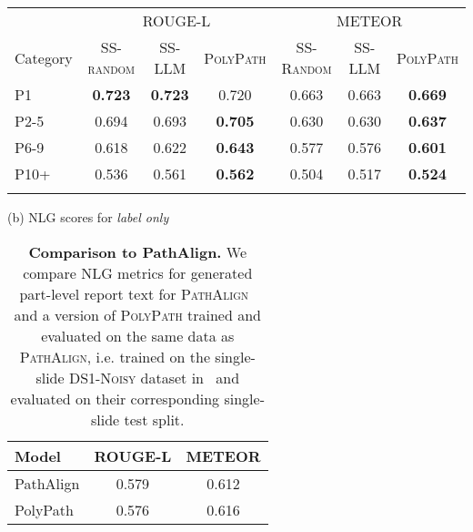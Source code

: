\documentclass[11pt]{article}
\newcommand{\tthnoisy}{\textsc{DS1-Noisy}\xspace}
\newcommand{\pathalign}{\textsc{PathAlign}\xspace}
\newcommand{\ourmodel}{\textsc{PolyPath}\xspace}
\newcommand{\randommodel}{\textsc{SS-Random}\xspace}
\newcommand{\llmmodel}{\textsc{SS-LLM}\xspace}
\begin{document}
\begin{table}[h]
\begin{tabular}{@{} l *{3}{c} *{3}{c} @{}}
\toprule
 & \multicolumn{3}{c}{ROUGE-L} & \multicolumn{3}{c}{METEOR} \\
\cmidrule(lr){2-4} \cmidrule(lr){5-7}
Category & \textsc{SS-random} & \textsc{SS-LLM} & \ourmodel & \randommodel & \llmmodel & \ourmodel \\
\midrule
P1    & \textbf{0.723} & \textbf{0.723} & 0.720 & 0.663 & 0.663 & \textbf{0.669} \\
P2-5  & 0.694 & 0.693 & \textbf{0.705} & 0.630 & 0.630 & \textbf{0.637} \\
P6-9  & 0.618 & 0.622 & \textbf{0.643} & 0.577 & 0.576 & \textbf{0.601} \\
P10+  & 0.536 & 0.561 & \textbf{0.562} & 0.504 & 0.517 & \textbf{0.524} \\
\Xhline{2.5\arrayrulewidth}
\end{tabular}
\vspace{0.1cm}

(b) NLG scores for \emph{label only}
\label{tab:nlgnoprompt}
\end{table}


\begin{table}[h]
\small
    \caption{\small \textbf{Comparison to PathAlign.} We compare NLG metrics for generated part-level report text for \pathalign~\citep{ahmed2024pathalign} and a version of \ourmodel trained and evaluated on the same data as \pathalign, i.e. trained on the single-slide \tthnoisy dataset in~\citet{ahmed2024pathalign} and evaluated on their corresponding single-slide test split.}
    \centering
    \begin{tabular}{lcc}
    \toprule
    Model & ROUGE-L & METEOR \\
    \midrule
    PathAlign & 0.579 & 0.612 \\
    PolyPath & 0.576 & 0.616 \\
    \bottomrule
    \end{tabular}
    \label{tab:pathaligncomparison}
\end{table}
\end{document}
